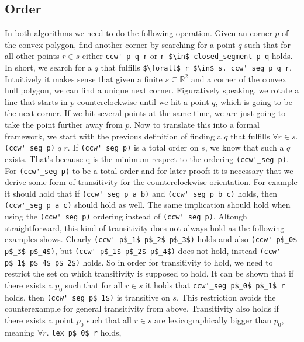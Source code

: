 \subsection{Order}
\label{sec:order}
In both algorithms we need to do the following operation. Given an corner $p$ of the convex polygon,
find another corner by searching for a point $q$ such that for all other points 
$r \in s$ either \lstinline|ccw' p q r| or \lstinline|r $\in$ closed_segment p q|
holds. In short, we search for a $q$ that fulfills  
\lstinline|$\forall$ r $\in$ s. ccw'_seg p q r|. 
Intuitively it makes sense that given a finite 
$s \subseteq \mathbb{R}^2$ and a corner of the convex hull polygon, 
we can find a unique next corner. Figuratively speaking, we rotate a line that 
starts in $p$ counterclockwise until we hit a point $q$, which is going to be the next
corner. If we hit several points at the same time, we are just going to take the point 
further away from $p$. Now to translate this into a formal framework, we start with
the previous definition of finding a $q$ that fulfills 
$\forall r \in s.$ \lstinline|(ccw'_seg p)| $q$ $r$. If \lstinline|(ccw'_seg p)| is a total
order on $s$, we know that such a $q$ exists. That's because q is the minimum
respect to the ordering \lstinline|(ccw'_seg p)|. For \lstinline|(ccw'_seg p)| to be a total order
and for later proofs it is necessary that we derive some form of transitivity for the
counterclockwise orientation. For example it should hold that if \lstinline|(ccw'_seg p a b)|
and \lstinline|(ccw'_seg p b c)| holds, then \lstinline|(ccw'_seg p a c)| should hold 
as well. The same implication should hold when using the \lstinline|(ccw'_seg p)| 
ordering instead of \lstinline|(ccw'_seg p)|. Altough straightforward, this kind of transitivity does not always
hold as the following examples shows. Clearly \lstinline|(ccw' p$_1$ p$_2$ p$_3$)| holds and also 
\lstinline|(ccw' p$_0$ p$_3$ p$_4$)|, but \lstinline|(ccw' p$_1$ p$_2$ p$_4$)| does not hold, instead 
\lstinline|(ccw' p$_1$ p$_4$ p$_2$)| holds. So in order for transitivity to hold, we need to restrict 
the set on which transitivity is supposed to hold. It can be shown that if there exists a $p_0$ such
that for all $r \in s$ it holds that \lstinline|ccw'_seg p$_0$ p$_1$ r| holds, then  
\lstinline|(ccw'_seg p$_1$)| is transitive on $s$. This restriction avoids the counterexample
for general transitivity from above. Transitivity also holds if there exists a point $p_0$ such 
that all $r \in s$ are lexicographically bigger than $p_0$, meaning $\forall r .$ \lstinline|lex p$_0$ r| holds,
